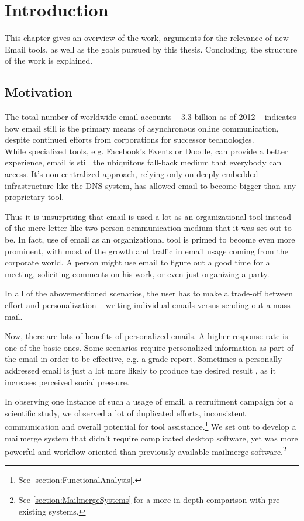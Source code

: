 \chapter{Introduction}
\label{chapter:Introduction}

This chapter gives an overview of the work, arguments for the relevance of new Email tools, as well as the goals pursued by this thesis. Concluding, the structure of the work is explained.

\section{Motivation}

The total number of worldwide email accounts -- 3.3 billion as of 2012 \citep{emailreport} -- indicates how email still is the primary means of asynchronous online communication, despite continued efforts from corporations for successor technologies. \\
While specialized tools, e.g. Facebook's Events or Doodle, can provide a better experience, email is still the ubiquitous fall-back medium that everybody can access. It's non-centralized approach, relying only on deeply embedded infrastructure like the DNS system, has allowed email to become bigger than any proprietary tool.

Thus it is unsurprising that email is used a lot as an organizational tool instead of the mere letter-like two person ocmmunication medium that it was set out to be. In fact, use of email as an organizational tool is primed to become even more prominent, with most of the growth and traffic in email usage coming from the corporate world. \citep[p. 3]{emailreport} A person might use email to figure out a good time for a meeting, soliciting comments on his work, or even just organizing a party.

In all of the abovementioned scenarios, the user has to make a trade-off between effort and personalization -- writing individual emails versus sending out a mass mail.

Now, there are lots of benefits of personalized emails. A higher response rate is one of the basic ones. Some scenarios require personalized information as part of the email in order to be effective, e.g. a grade report. Sometimes a personally addressed email is just a lot more likely to produce the desired result \citep[p. 1375, 1380]{emailsalutation}, as it increases perceived social pressure.

In observing one instance of such a usage of email, a recruitment campaign for a scientific study, we observed a lot of duplicated efforts, inconsistent communication and overall potential for tool assistance.\footnote{See \autoref{section:FunctionalAnalysis}.} We set out to develop a mailmerge system that didn't require complicated desktop software, yet was more powerful and workflow oriented than previously available mailmerge software.\footnote{See \autoref{section:MailmergeSystems} for a more in-depth comparison with pre-existing systems.}


